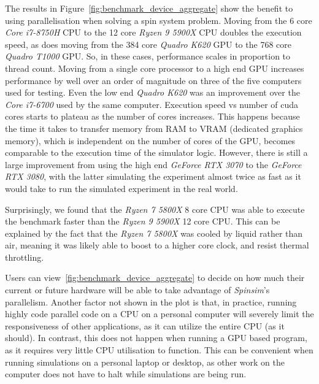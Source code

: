 \documentclass{jors}
\begin{document}
		The results in Figure~\ref{fig:benchmark_device_aggregate} show the benefit to using parallelisation when solving a spin system problem.
		Moving from the 6 core \emph{Core i7-8750H} CPU to the 12 core \emph{Ryzen 9 5900X} CPU doubles the execution speed, as does moving from the 384 core \emph{Quadro K620} GPU to the 768 core \emph{Quadro T1000} GPU.
		So, in these cases, performance scales in proportion to thread count.
		Moving from a single core processor to a high end GPU increases performance by well over an order of magnitude on three of the five computers used for testing.
		Even the low end \emph{Quadro K620} was an improvement over the \emph{Core i7-6700} used by the same computer.
		Execution speed vs number of cuda cores starts to plateau as the number of cores increases.
		This happens because the time it takes to transfer memory from RAM to VRAM (dedicated graphics memory), which is independent on the number of cores of the GPU, becomes comparable to the execution time of the simulator logic.
		However, there is still a large improvement from using the high end \emph{GeForce RTX 3070} to the \emph{GeForce RTX 3080}, with the latter simulating the experiment almost twice as fast as it would take to run the simulated experiment in the real world.

		Surprisingly, we found that the \emph{Ryzen 7 5800X} 8 core CPU was able to execute the benchmark faster than the \emph{Ryzen 9 5900X} 12 core CPU.
		This can be explained by the fact that the \emph{Ryzen 7 5800X} was cooled by liquid rather than air, meaning it was likely able to boost to a higher core clock, and resist thermal throttling.

		Users can view~\ref{fig:benchmark_device_aggregate} to decide on how much their current or future hardware will be able to take advantage of \emph{Spinsim}'s parallelism.
		Another factor not shown in the plot is that, in practice, running highly code parallel code on a CPU on a personal computer will severely limit the responsiveness of other applications, as it can utilize the entire CPU (as it should).
		In contrast, this does not happen when running a GPU based program, as it requires very little CPU utilisation to function.
		This can be convenient when running simulations on a personal laptop or desktop, as other work on the computer does not have to halt while simulations are being run.
\end{document}
